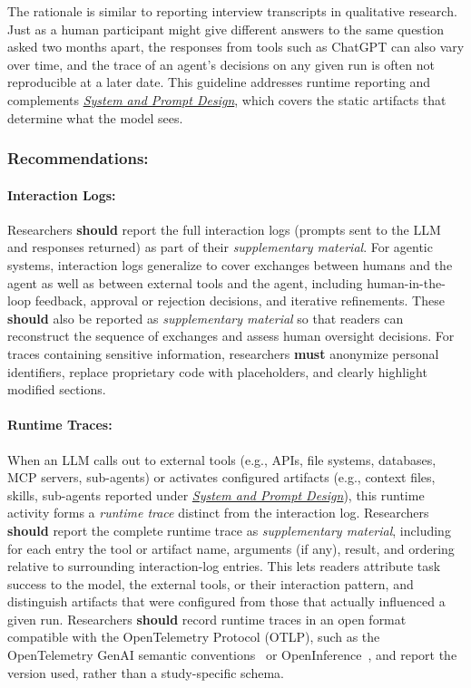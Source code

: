 \documentclass[smallextended]{svjour3}
\newcommand{\must}{\textbf{must}\xspace}
\newcommand{\should}{\textbf{should}\xspace}
\newcommand{\supplementarymaterial}{\emph{supplementary material}\xspace}
\newcommand{\supplementarymaterial}{\emph{supplementary material}\xspace}
\newcommand{\design}{\hyperref[sec:report-system-and-prompt-design]{\emph{System and Prompt Design}}\xspace}
\newcommand{\design}{\href{/guidelines\#report-system-and-prompt-design}{\emph{System and Prompt Design}}\xspace}
\newcommand{\guidelinesubsubsection}[1]{\subsubsection{\bfseries #1:}}
\newcommand{\guidelinesubsubsection}[1]{\subsubsection{#1}}
\begin{document}
The rationale is similar to reporting interview transcripts in qualitative research.
Just as a human participant might give different answers to the same question asked two months apart, the responses from tools such as ChatGPT can also vary over time, and the trace of an agent's decisions on any given run is often not reproducible at a later date.
This guideline addresses runtime reporting and complements \design, which covers the static artifacts that determine what the model sees.

\guidelinesubsubsection{Recommendations}

\paragraph{Interaction Logs:}
Researchers \should report the full interaction logs (prompts sent to the LLM and responses returned) as part of their \supplementarymaterial.
For agentic systems, interaction logs generalize to cover exchanges between humans and the agent as well as between external tools and the agent, including human-in-the-loop feedback, approval or rejection decisions, and iterative refinements.
These \should also be reported as \supplementarymaterial so that readers can reconstruct the sequence of exchanges and assess human oversight decisions.
For traces containing sensitive information, researchers \must anonymize personal identifiers, replace proprietary code with placeholders, and clearly highlight modified sections.

\paragraph{Runtime Traces:}
When an LLM calls out to external tools (e.g., APIs, file systems, databases, MCP servers, sub-agents) or activates configured artifacts (e.g., context files, skills, sub-agents reported under \design), this runtime activity forms a \emph{runtime trace} distinct from the interaction log.
Researchers \should report the complete runtime trace as \supplementarymaterial, including for each entry the tool or artifact name, arguments (if any), result, and ordering relative to surrounding interaction-log entries.
This lets readers attribute task success to the model, the external tools, or their interaction pattern, and distinguish artifacts that were configured from those that actually influenced a given run.
Researchers \should record runtime traces in an open format compatible with the OpenTelemetry Protocol (OTLP), such as the OpenTelemetry GenAI semantic conventions~\cite{otel_genai_semconv} or OpenInference~\cite{openinference_spec}, and report the version used, rather than a study-specific schema.
\end{document}
